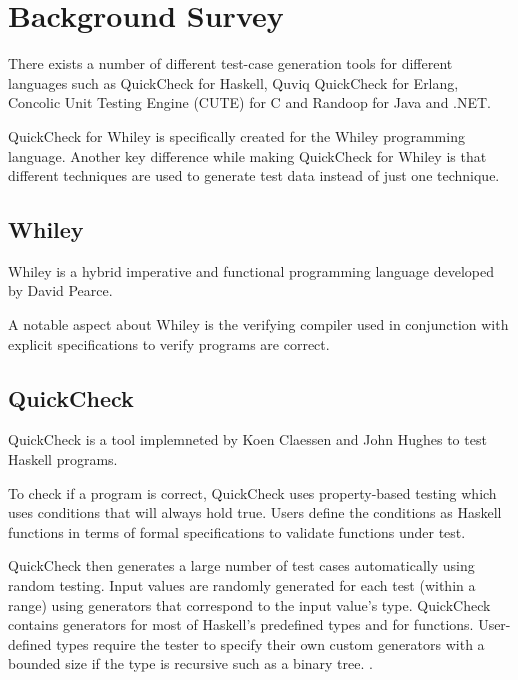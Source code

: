 \chapter{Background Survey}\label{chapter:background}


There exists a number of different test-case generation tools for different languages such as QuickCheck for Haskell, Quviq QuickCheck for Erlang, Concolic Unit Testing Engine (CUTE) for C and Randoop for Java and .NET.


QuickCheck for Whiley is specifically created for the Whiley programming language.
Another key difference while making QuickCheck for Whiley is that different techniques are used to generate test data instead of just one technique.



\section{Whiley}
Whiley is a hybrid imperative and functional programming language developed by David Pearce.

A notable aspect about Whiley is the verifying compiler used in conjunction with explicit specifications to verify programs are correct.



\section{QuickCheck}
QuickCheck is a tool implemneted by Koen Claessen and John Hughes \cite{QClightweight} to test Haskell programs.

To check if a program is correct, QuickCheck uses property-based testing which uses conditions that will always hold true. Users define the conditions as Haskell functions in terms of formal specifications to validate functions under test. 

QuickCheck then generates a large number of test cases automatically using random testing. Input values are randomly generated for each test (within a range) using generators that correspond to the input value's type. QuickCheck contains generators for most of Haskell's predefined types and for functions. User-defined types require the tester to specify their own custom generators with a bounded size if the type is recursive such as a binary tree. \cite{QClightweight}. 

